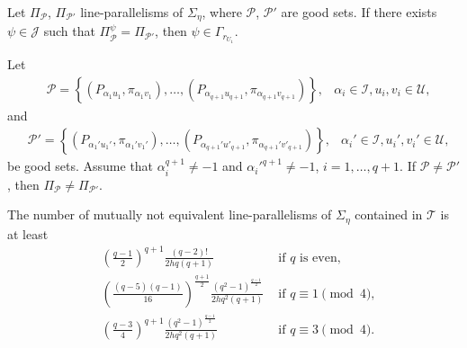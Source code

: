 \documentclass[10pt,a4paper]{amsart}
\def\cI{\mathcal I}
\def\cJ{\mathcal J}
\def\cP{\mathcal P}
\def\cT{\mathcal T}
\def\cU{\mathcal U}
\begin{document}
\begin{prop}\label{automorphisms}
Let $\Pi_{\cP}$, $\Pi_{\cP'}$ line-parallelisms of $\Sigma_{\eta}$, where $\cP$, $\cP'$ are good sets. If there exists $ \psi \in \cJ$ such that $\Pi_{\cP}^\psi = \Pi_{\cP'}$, then $\psi \in \Gamma_{r_{U_1}}$. 
\end{prop}

\begin{prop}\label{distinctgoodsets}
Let \begin{align*}
& \cP = \left\{\left(P_{\alpha_{1} u_1}, \pi_{\alpha_{1} v_1}\right), \dots, \left(P_{\alpha_{{q+1}} u_{q+1}}, \pi_{\alpha_{{q+1}} v_{q+1}}\right)\right\}, & \alpha_{i} \in \cI, u_i, v_i \in \cU, 
\end{align*}
and 
\begin{align*}
& \cP' = \left\{\left(P_{\alpha_{1}' u_1'}, \pi_{\alpha_{1}' v_1'}\right), \dots, \left(P_{\alpha_{q+1}' u'_{q+1}}, \pi_{\alpha_{q+1}' v'_{q+1}}\right)\right\}, & \alpha_{i}' \in \cI, u_i', v_i' \in \cU, 
\end{align*}
be good sets. Assume that $\alpha_i^{q+1}\neq -1$ and $\alpha_i'^{q+1}\neq -1$, $i = 1, \dots, q+1$. If $\cP \ne \cP'$, then $\Pi_{\cP} \ne \Pi_{\cP'}$.
\end{prop}

\begin{theorem}
The number of mutually not equivalent line-parallelisms of $\Sigma_{\eta}$ contained in $\cT$ is at least
    \begin{align*}
      & \left(\frac{q-1}{2}\right)^{q+1} \frac{(q-2)!}{2hq(q+1)} & \mbox{ if } q \mbox{ is even, } \\
      & \left(\frac{(q-5)(q-1)}{16}\right)^{\frac{q+1}{2}} \frac{(q^2-1)^{\frac{q-1}{2}}}{2hq^2(q+1)} & \mbox{ if }q \equiv 1 \pmod{4}, \\ 
      &  \left(\frac{q-3}{4}\right)^{q+1} \frac{(q^2-1)^{\frac{q-1}{2}}}{2hq^2(q+1)} & \mbox{ if } q \equiv 3 \pmod{4}.  
    \end{align*}
\end{theorem}
\end{document}
